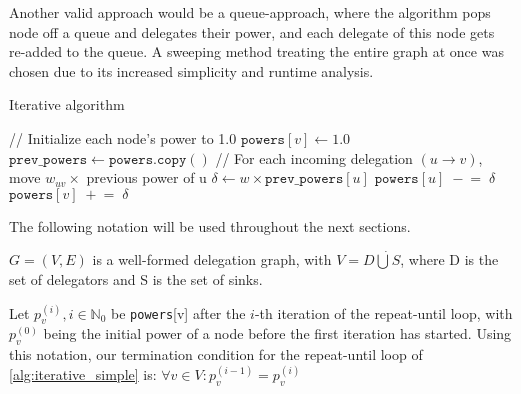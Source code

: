 
Another valid approach would be a queue-approach, where the algorithm pops node off a queue and delegates their power, and each delegate of this node gets re-added to the queue. A sweeping method treating the entire graph at once was chosen due to its increased simplicity and runtime analysis.

\begin{algorithm} [t]
 \caption{Iterative algorithm}\label{alg:iterative_simple}
\begin{algorithmic}[1]
\State // Initialize each node’s power to 1.0  
    \State \(\texttt{powers}[v] \gets 1.0\)
\EndFor
\Repeat
    \State \(\texttt{prev\_powers} \gets \texttt{powers}.\texttt{copy}()\)  
        \State // For each incoming delegation \((u \to v)\), move \(w_{uv}\times\) previous power of u
            \State \(\delta \gets w \times \texttt{prev\_powers}[u]\) \label{alg:iterative_simple_delta_assignment}
            \State \(\texttt{powers}[u] \;-\!=\; \delta\) \label{alg:iterative_simple_remove_delta}
            \State \(\texttt{powers}[v] \;+\!=\; \delta\) \label{alg:iterative_simple_add_delta}
        \EndFor
    \EndFor
{} \label{alg:iterative_simple_termination_cond}
\end{algorithmic}
\end{algorithm}

The following notation will be used throughout the next sections.

$G = (V, E)$ is a well-formed delegation graph, with $V = D \dot\bigcup S$, where D is the set of delegators and S is the set of sinks.

Let $p_v^{(i)}, i \in \mathbb{N}_0$ be \texttt{powers}[v] after the $i$-th iteration of the repeat-until loop, with $p_v^{(0)}$ being the initial power of a node before the first iteration has started. Using this notation, our termination condition for the repeat-until loop of \cref{alg:iterative_simple} is: $\forall v \in V: p_v^{(i-1)} = p_v^{(i)}$

